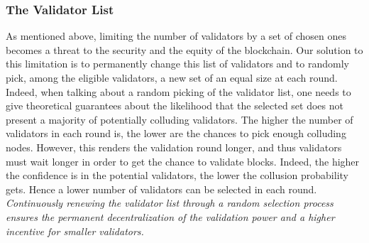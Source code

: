 \subsubsection{The Validator List}
As mentioned above, limiting the number of validators by a set of chosen ones becomes a threat to the security and the equity of the blockchain. Our solution to this limitation is to permanently change this list of validators and to randomly pick, among the eligible validators, a new set of an equal size at each round. Indeed, when talking about a random picking of the validator list, one needs to give theoretical guarantees about the likelihood that the selected set does not present a majority of potentially colluding validators. The higher the number of validators in each round is, the lower are the chances to pick enough colluding nodes. However, this renders the validation round longer, and thus validators must wait longer in order to get the chance to validate blocks. Indeed, the higher the confidence is in the potential validators, the lower the collusion probability gets. Hence a lower number of validators can be selected in each round.\\

\textit{Continuously renewing the validator list through a random selection process ensures the permanent decentralization of the validation power and a higher incentive for smaller validators.}

